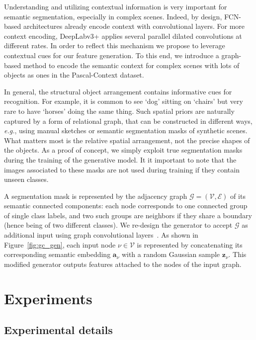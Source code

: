 \documentclass{article}
\begin{document}
Understanding and utilizing contextual information is very important for semantic segmentation, especially in complex scenes.
Indeed, by design, FCN-based architectures already encode context with convolutional layers.
For more context encoding, DeepLabv3+ applies several parallel dilated convolutions at different rates.
In order to reflect this mechanism we propose to leverage contextual cues for our feature generation.
To this end, we introduce a graph-based method to encode the semantic context for complex scenes with lots of objects as ones in the Pascal-Context dataset. 

In general, the structural object arrangement contains informative cues for recognition.
For example, it is common to see `dog' sitting on `chairs' but very rare to have `horses' doing the same thing. Such spatial priors are naturally captured by a form of relational graph, that can be constructed in different ways, \textit{e.g.}, using manual sketches or semantic segmentation masks of synthetic scenes. What matters most is the relative spatial arrangement, not the precise shapes of the objects. As a proof of concept, we simply exploit true segmentation masks during the training of the generative model. It it important to note that the images associated to these masks are not used during training if they contain unseen classes.      

A segmentation mask is represented by the adjacency graph $\mathcal{G=(\mathcal{V}, \mathcal{E})}$ of its semantic connected components: each node corresponds to one connected group of single class labels, and two such groups are neighbors if they share a boundary (hence being of two different classes). 
We re-design the generator to accept $\mathcal{G}$ as additional input using graph convolutional layers~\cite{kipf2016semi}.
As shown in Figure~\ref{fig:gc_gen}, each input node $\nu \in \mathcal{V}$ is represented by concatenating its corresponding semantic embedding $\mathbf{a}_{\nu}$ with a random Gaussian sample $\mathbf{z}_{\nu}$.
This modified generator outputs features attached to the nodes of the input graph.

 \section{Experiments}




\subsection{Experimental details}\label{sec:exp_detail}
\vspace{-0.3cm}
\end{document}

